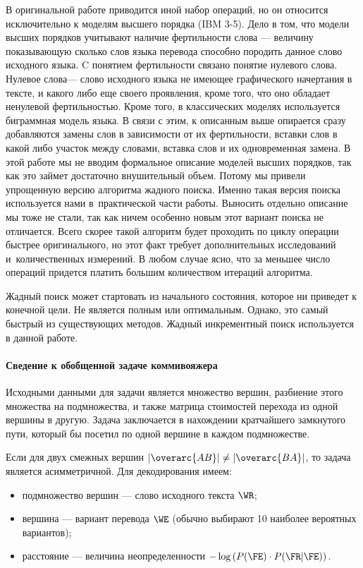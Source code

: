 В оригинальной работе \cite{Fast-Decoding:2003} приводится 
иной набор операций, но он относится исключительно к моделям высшего порядка (IBM 3-5).
Дело в том, что модели высших порядков учитывают наличие фертильности
слова --- величину показывающую сколько слов языка перевода 
способно породить данное слово исходного языка. 
C понятием фертильности связано понятие нулевого слова. 
Нулевое слова--- слово исходного языка не имеющее графического начертания в тексте,
и какого либо еще своего проявления, кроме того,
что оно обладает ненулевой фертильностью.
Кроме того, в классических 
моделях используется биграммная модель языка.
В связи с этим, к описанным выше опирается сразу добавляются
замены слов в зависимости от их фертильности,
вставки слов в какой либо участок между словами,
вставка слов и их одновременная замена.
В этой работе мы не вводим формальное описание моделей 
высших порядков, так как это займет достаточно внушительный объем.
Потому мы привели упрощенную версию алгоритма жадного поиска.
Именно такая версия поиска используется нами 
в~практической части работы.
Выносить отдельно описание мы тоже не стали,
так как ничем особенно новым этот вариант поиска не отличается.
Всего скорее такой алгоритм будет проходить по циклу операции быстрее 
оригинального, но этот факт требует дополнительных исследований 
и~количественных измерений.
В любом случае ясно, что за меньшее число операций придется платить
большим количеством итераций алгоритма.

Жадный поиск может стартовать из начального состояния, 
которое ни приведет к конечной цели.
Не является полным или оптимальным. 
Однако, это самый быстрый из существующих методов.
Жадный инкрементный поиск используется в данной работе.

\paragraph{Сведение к обобщенной задаче коммивояжера}

Исходными данными для задачи является множество вершин, 
разбиение этого множества на подмножества, 
и также матрица стоимостей перехода из одной вершины в другую. 
Задача заключается в нахождении кратчайшего замкнутого пути, 
который бы посетил по одной вершине в каждом подмножестве.

Если для двух смежных вершин $|\overarc{AB}| \ne |\overarc{BA}|$, то задача является асимметричной.
Для декодирования имеем:
\begin{itemize}	
	\item подмножество вершин --- слово исходного текста $\WR$;
	\item вершина --- вариант перевода $\WE$ (обычно выбирают 10 наиболее вероятных вариантов);
	\item расстояние --- величина неопределенности $-\log \left(  P(\FE) \cdot P(\FR|\FE) \right)$.
\end{itemize} 

